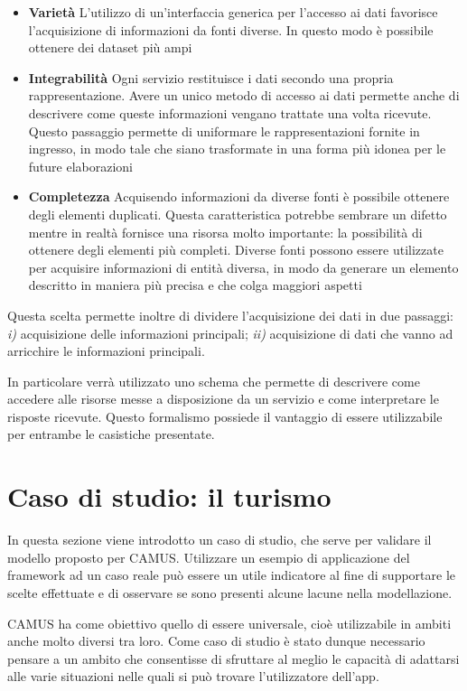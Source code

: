 \begin{itemize}
	\item \textbf{Varietà}	L'utilizzo di un'interfaccia generica per l'accesso ai dati favorisce l'acquisizione di informazioni da fonti diverse. In questo modo è possibile ottenere dei dataset più ampi
	\item \textbf{Integrabilità} Ogni servizio restituisce i dati secondo una propria rappresentazione. Avere un unico metodo di accesso ai dati permette anche di descrivere come queste informazioni vengano trattate una volta ricevute. Questo passaggio permette di uniformare le rappresentazioni fornite in ingresso, in modo tale che siano trasformate in una forma più idonea per le future elaborazioni
	\item \textbf{Completezza} Acquisendo informazioni da diverse fonti è possibile ottenere degli elementi duplicati. Questa caratteristica potrebbe sembrare un difetto mentre in realtà fornisce una risorsa molto importante: la possibilità di ottenere degli elementi più completi. Diverse fonti possono essere utilizzate per acquisire informazioni di entità diversa, in modo da generare un elemento descritto in maniera più precisa e che colga maggiori aspetti
\end{itemize}

Questa scelta permette inoltre di dividere l'acquisizione dei dati in due passaggi: \emph{i)} acquisizione delle informazioni principali; \emph{ii)} acquisizione di dati che vanno ad arricchire le informazioni principali. 

In particolare verrà utilizzato uno schema che permette di descrivere come accedere alle risorse messe a disposizione da un servizio e come interpretare le risposte ricevute. Questo formalismo possiede il vantaggio di essere utilizzabile per entrambe le casistiche presentate.

\section{Caso di studio: il turismo\label{sec:caso-studio-turismo}}

In questa sezione viene introdotto un caso di studio, che serve per validare il modello proposto per CAMUS. Utilizzare un esempio di applicazione del framework ad un caso reale può essere un utile indicatore al fine di supportare le scelte effettuate e di osservare se sono presenti alcune lacune nella modellazione.

CAMUS ha come obiettivo quello di essere universale, cioè utilizzabile in ambiti anche molto diversi tra loro. Come caso di studio è stato dunque necessario pensare a un ambito che consentisse di sfruttare al meglio le capacità di adattarsi alle varie situazioni nelle quali si può trovare l'utilizzatore dell'app.

